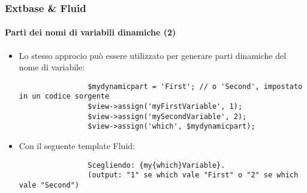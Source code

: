\begin{frame}[fragile]
	\frametitle{Extbase \& Fluid}
	\framesubtitle{Parti dei nomi di variabili dinamiche (2)}

	\lstset{basicstyle=\tiny\ttfamily}

	\begin{itemize}

		\item Lo stesso approcio può essere utilizzato per generare parti dinamiche del nome di variabile:

			\begin{lstlisting}
				$mydynamicpart = 'First'; // o 'Second', impostato in un codice sorgente
				$view->assign('myFirstVariable', 1);
				$view->assign('mySecondVariable', 2);
				$view->assign('which', $mydynamicpart);
			\end{lstlisting}

		\item Con il seguente template Fluid:

			\begin{lstlisting}
				Scegliendo: {my{which}Variable}.
				(output: "1" se which vale "First" o "2" se which vale "Second")
			\end{lstlisting}

	\end{itemize}

\end{frame}


